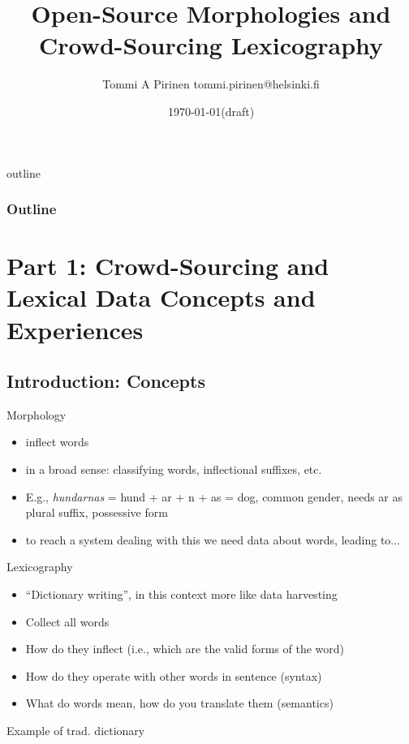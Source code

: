 \documentclass[t,12pt]{beamer}
\title[Open- and Crowd-sourced Lexicography]{Open-Source Morphologies and Crowd-Sourcing Lexicography}
\author[Tommi A Pirinen]{Tommi A Pirinen \scriptsize \guilsinglleft{}tommi.pirinen@helsinki.fi\guilsinglright{}}
\institute[University of Helsinki]{Department of Speech Sciences\\University of Helsinki}
\date{\today (draft)}
\begin{document}

\HyTitle

\begin{frame}{outline}
    \frametitle{Outline}
    \tableofcontents
\end{frame}

\section{Part 1: Crowd-Sourcing and Lexical Data Concepts and Experiences}

\subsection{Introduction: Concepts}

\begin{frame}{Morphology}
    \begin{itemize}
        \item inflect words
        \item in a broad sense: classifying words, inflectional suffixes, etc.
        \item E.g., \emph{hundarnas} = hund + ar + n + as = dog, common gender,
            needs ar as plural suffix, possessive form
        \item to reach a system dealing with this we need data about
            words, leading to...
    \end{itemize}
\end{frame}

\begin{frame}{Lexicography}
    \begin{itemize}
        \item ``Dictionary writing'', in this context more like data harvesting
        \item Collect all words
        \item How do they inflect (i.e., which are the valid forms of the word)
        \item How do they operate with other words in sentence (syntax)
        \item What do words mean, how do you translate them (semantics)
    \end{itemize}
\end{frame}

\begin{frame}{Example of trad. dictionary}
\end{frame}
\end{document}
